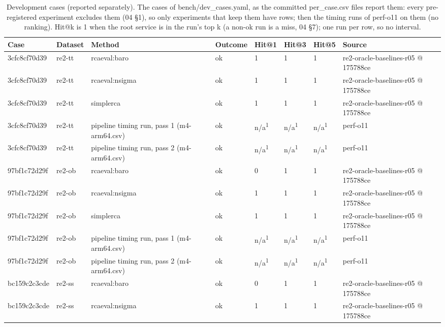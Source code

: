 \begin{table}[t]
\centering
\caption{Development cases (reported separately). The cases of bench/dev\_cases.yaml, as the committed per\_case.csv files report them: every pre-registered experiment excludes them (04 \S{}1), so only experiments that keep them have rows; then the timing runs of perf-o11 on them (no ranking). Hit@k is 1 when the root service is in the run's top k (a non-ok run is a miss, 04 \S{}7); one run per row, so no interval.}
\label{tab:a2-development-cases}
\small
\begin{tabular}{llllllll}
\hline
Case & Dataset & Method & Outcome & Hit@1 & Hit@3 & Hit@5 & Source \\
\hline
3cfc8cf70d39 & re2-tt & rcaeval:baro & ok & 1 & 1 & 1 & re2-oracle-baselines-r05 @ 175788ce \\
3cfc8cf70d39 & re2-tt & rcaeval:nsigma & ok & 1 & 1 & 1 & re2-oracle-baselines-r05 @ 175788ce \\
3cfc8cf70d39 & re2-tt & simplerca & ok & 1 & 1 & 1 & re2-oracle-baselines-r05 @ 175788ce \\
3cfc8cf70d39 & re2-tt & pipeline timing run, pass 1 (m4-arm64.csv) & ok & n/a\textsuperscript{1} & n/a\textsuperscript{1} & n/a\textsuperscript{1} & perf-o11 \\
3cfc8cf70d39 & re2-tt & pipeline timing run, pass 2 (m4-arm64.csv) & ok & n/a\textsuperscript{1} & n/a\textsuperscript{1} & n/a\textsuperscript{1} & perf-o11 \\
97bf1c72d29f & re2-ob & rcaeval:baro & ok & 0 & 1 & 1 & re2-oracle-baselines-r05 @ 175788ce \\
97bf1c72d29f & re2-ob & rcaeval:nsigma & ok & 1 & 1 & 1 & re2-oracle-baselines-r05 @ 175788ce \\
97bf1c72d29f & re2-ob & simplerca & ok & 1 & 1 & 1 & re2-oracle-baselines-r05 @ 175788ce \\
97bf1c72d29f & re2-ob & pipeline timing run, pass 1 (m4-arm64.csv) & ok & n/a\textsuperscript{1} & n/a\textsuperscript{1} & n/a\textsuperscript{1} & perf-o11 \\
97bf1c72d29f & re2-ob & pipeline timing run, pass 2 (m4-arm64.csv) & ok & n/a\textsuperscript{1} & n/a\textsuperscript{1} & n/a\textsuperscript{1} & perf-o11 \\
bc159c2c3cde & re2-ss & rcaeval:baro & ok & 0 & 1 & 1 & re2-oracle-baselines-r05 @ 175788ce \\
bc159c2c3cde & re2-ss & rcaeval:nsigma & ok & 1 & 1 & 1 & re2-oracle-baselines-r05 @ 175788ce \\

\end{tabular}
\end{table}
